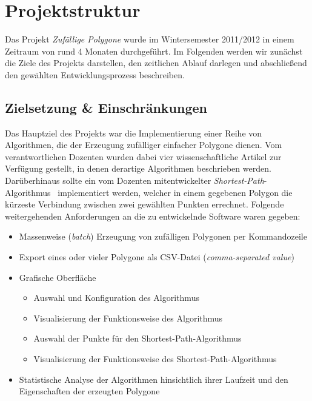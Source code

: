 \section{Projektstruktur}

  Das Projekt \emph{Zufällige Polygone} wurde im Wintersemester 2011/2012 in
  einem Zeitraum von rund 4 Monaten durchgeführt. Im Folgenden werden wir
  zunächst die Ziele des Projekts darstellen, den zeitlichen Ablauf darlegen
  und abschließend den gewählten Entwicklungsprozess beschreiben.

  \subsection{Zielsetzung \& Einschränkungen}

    Das Hauptziel des Projekts war die Implementierung einer Reihe von
    Algorithmen, die der Erzeugung zufälliger einfacher Polygone dienen. Vom
    verantwortlichen Dozenten wurden dabei vier wissenschaftliche Artikel zur
    Verfügung gestellt, in denen derartige Algorithmen beschrieben
    werden. Darüberhinaus sollte ein vom Dozenten mitentwickelter \emph
    {Shortest-Path}-Algorithmus~\cite{asano11shortestpath} implementiert werden,
    welcher in einem gegebenen Polygon die kürzeste Verbindung zwischen zwei
    gewählten Punkten errechnet. Folgende weitergehenden Anforderungen an die zu
    entwickelnde Software waren gegeben:

    \begin{itemize}
      \item Massenweise (\emph{batch}) Erzeugung von zufälligen Polygonen 
            per Kommandozeile
      \item Export eines oder vieler Polygone als CSV-Datei 
            (\emph{comma-separated value})
      \item Grafische Oberfläche
      \begin{itemize}
        \item Auswahl und Konfiguration des Algorithmus
        \item Visualisierung der Funktionsweise des Algorithmus
        \item Auswahl der Punkte für den Shortest-Path-Algorithmus
        \item Visualisierung der Funktionsweise des Shortest-Path-Algorithmus
      \end{itemize}
      \item Statistische Analyse der Algorithmen hinsichtlich ihrer Laufzeit 
            und den Eigenschaften der erzeugten Polygone
    \end{itemize}

